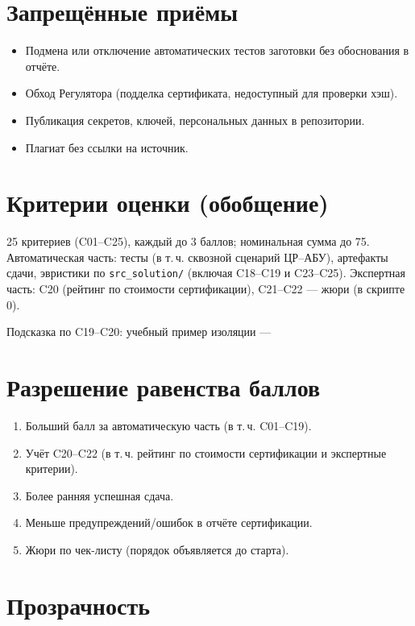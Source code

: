 \section*{Запрещённые приёмы}

\begin{itemize}
  \item Подмена или отключение автоматических тестов заготовки без обоснования в отчёте.
  \item Обход Регулятора (подделка сертификата, недоступный для проверки хэш).
  \item Публикация секретов, ключей, персональных данных в репозитории.
  \item Плагиат без ссылки на источник.
\end{itemize}

\section*{Критерии оценки (обобщение)}

25 критериев (C01--C25), каждый до 3 баллов; номинальная сумма до 75. Автоматическая часть: тесты (в т.\,ч. сквозной сценарий ЦР--АБУ), артефакты сдачи, эвристики по \texttt{src\_solution/} (включая C18--C19 и C23--C25). Экспертная часть: C20 (рейтинг по стоимости сертификации), C21--C22 --- жюри (в скрипте 0).

Подсказка по C19--C20: учебный пример изоляции ---\\

\section*{Разрешение равенства баллов}

\begin{enumerate}
  \item Больший балл за автоматическую часть (в т.\,ч. C01--C19).
  \item Учёт C20--C22 (в т.\,ч. рейтинг по стоимости сертификации и экспертные критерии).
  \item Более ранняя успешная сдача.
  \item Меньше предупреждений/ошибок в отчёте сертификации.
  \item Жюри по чек-листу (порядок объявляется до старта).
\end{enumerate}

\section*{Прозрачность}


